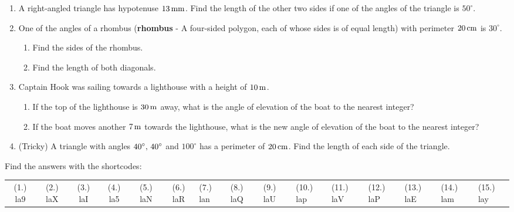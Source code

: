\begin{enumerate}[noitemsep, label=\textbf{\arabic*}. ]
\label{m39414*uid112}\item A right-angled triangle has hypotenuse $13\phantom{\rule{0.166667em}{0ex}}\mathrm{mm}$. Find the length of the other two sides if one of the angles of the triangle is ${50}^{\circ }$.\newline
\label{m39414*uid113}\item One of the angles of a rhombus (\textbf{rhombus} - A four-sided polygon, each of whose sides is of equal length) with perimeter $20\phantom{\rule{0.166667em}{0ex}}\mathrm{cm}$ is ${30}^{\circ }$.
\label{m39414*id92966}\begin{enumerate}[noitemsep, label=\textbf{\alph*}. ] 
            \label{m39414*uid114}\item Find the sides of the rhombus.
\label{m39414*uid115}\item Find the length of both diagonals.
\end{enumerate}
                \label{m39414*uid116}\item Captain Hook was sailing towards a lighthouse with a height of $10\phantom{\rule{0.166667em}{0ex}}\mathrm{m}$.
\label{m39414*id93025}\begin{enumerate}[noitemsep, label=\textbf{\alph*}. ] 
            \label{m39414*uid117}\item If the top of the lighthouse is $30\phantom{\rule{0.166667em}{0ex}}\mathrm{m}$ away, what is the angle of elevation of the boat to the nearest integer?
\label{m39414*uid118}\item If the boat moves another $7\phantom{\rule{0.166667em}{0ex}}\mathrm{m}$ towards the lighthouse, what is the new angle of elevation of the boat to the nearest integer?
\end{enumerate}
                \label{m39414*uid119}\item (Tricky) A triangle with angles ${40}^{\circ },\phantom{\rule{0.166667em}{0ex}}{40}^{\circ }$ and ${100}^{\circ }$ has a perimeter of $20\phantom{\rule{0.166667em}{0ex}}\mathrm{cm}$. Find the length of each side of the triangle.\newline
\end{enumerate}
  \label{m39414**end}
  \label{fbcda86bdf0258b6e91dcea5caee5b76**end}
\par {} Find the answers with the shortcodes:
 \par \begin{tabular}[h]{cccccc}
 (1.) la9  &  (2.) laX  &  (3.) laI  &  (4.) la5  &  (5.) laN  &  (6.) laR  &  (7.) lan  &  (8.) laQ  &  (9.) laU  &  (10.) lap  &  (11.) laV  &  (12.) laP  &  (13.) laE  &  (14.) lam  &  (15.) lay  & \end{tabular}

